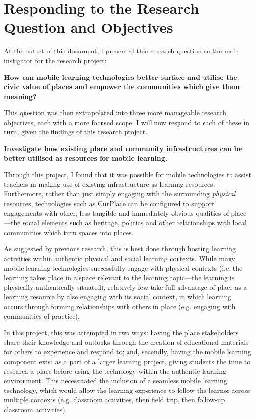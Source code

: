 \section{Responding to the Research Question and Objectives}
\label{sec:RespondingtoQuestions}

At the outset of this document, I presented this research question as the main instigator for the research project:

\begin{displayquote}
\textbf{How can mobile learning technologies better surface and utilise the civic value of places and empower the communities which give them meaning?}
\end{displayquote}

This question was then extrapolated into three more manageable research objectives, each with a more focused scope. I will now respond to each of these in turn, given the findings of this research project.

\begin{displayquote}
\textbf{Investigate how existing place and community infrastructures can be better utilised as resources for mobile learning.}
\end{displayquote}

Through this project, I found that it was possible for mobile technologies to assist teachers in making use of existing infrastructure as learning resources. Furthermore, rather than just simply engaging with the surrounding \textit{physical} resources, technologies such as OurPlace can be configured to support engagements with other, less tangible and immediately obvious qualities of place---the social elements such as heritage, politics and other relationships with local communities which turn spaces into places. 

As suggested by previous research, this is best done through hosting learning activities within authentic physical and social learning contexts. While many mobile learning technologies successfully engage with physical contexts (i.e. the learning takes place in a space relevant to the learning topic---the learning is physically authentically situated), relatively few take full advantage of place as a learning resource by also engaging with its social context, in which learning occurs through forming relationships with others in place (e.g. engaging with communities of practice). 

In this project, this was attempted in two ways: having the place stakeholders share their knowledge and outlooks through the creation of educational materials for others to experience and respond to; and, secondly, having the mobile learning component exist as a part of a larger learning project, giving students the time to research a place before using the technology within the authentic learning environment. This necessitated the inclusion of a seamless mobile learning technology, which would allow the learning experience to follow the learner across multiple contexts (e.g. classroom activities, then field trip, then follow-up classroom activities). 

